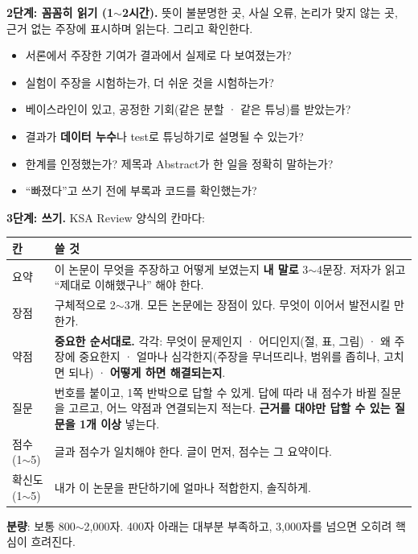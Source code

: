 \documentclass[11pt]{article}
\begin{document}
\vspace{3pt}
\noindent\textbf{2단계: 꼼꼼히 읽기 (1$\sim$2시간).} 뜻이 불분명한 곳, 사실 오류, 논리가 맞지 않는 곳, 근거 없는 주장에 표시하며 읽는다. 그리고 확인한다.
\begin{itemize}
\item 서론에서 주장한 기여가 결과에서 실제로 다 보여졌는가?
\item 실험이 주장을 시험하는가, 더 쉬운 것을 시험하는가?
\item 베이스라인이 있고, 공정한 기회(같은 분할 · 같은 튜닝)를 받았는가?
\item 결과가 \textbf{데이터 누수}나 test로 튜닝하기로 설명될 수 있는가?
\item 한계를 인정했는가? 제목과 Abstract가 한 일을 정확히 말하는가?
\item ``빠졌다''고 쓰기 전에 부록과 코드를 확인했는가?
\end{itemize}

\noindent\textbf{3단계: 쓰기.} KSA Review 양식의 칸마다:
\begin{center}
\small
\begin{tabular}{@{}p{2.6cm}p{10.6cm}@{}}
\toprule
\textbf{칸} & \textbf{쓸 것} \\
\midrule
요약 & 이 논문이 무엇을 주장하고 어떻게 보였는지 \textbf{내 말로} 3$\sim$4문장. 저자가 읽고 ``제대로 이해했구나'' 해야 한다. \\
장점 & 구체적으로 2$\sim$3개. 모든 논문에는 장점이 있다. 무엇이 이어서 발전시킬 만한가. \\
약점 & \textbf{중요한 순서대로.} 각각: 무엇이 문제인지 · 어디인지(절, 표, 그림) · 왜 주장에 중요한지 · 얼마나 심각한지(주장을 무너뜨리나, 범위를 좁히나, 고치면 되나) · \textbf{어떻게 하면 해결되는지}. \\
질문 & 번호를 붙이고, 1쪽 반박으로 답할 수 있게. 답에 따라 내 점수가 바뀔 질문을 고르고, 어느 약점과 연결되는지 적는다. \textbf{근거를 대야만 답할 수 있는 질문을 1개 이상} 넣는다. \\
점수 (1$\sim$5) & 글과 점수가 일치해야 한다. 글이 먼저, 점수는 그 요약이다. \\
확신도 (1$\sim$5) & 내가 이 논문을 판단하기에 얼마나 적합한지, 솔직하게. \\
\bottomrule
\end{tabular}
\end{center}

\noindent\textbf{분량}: 보통 800$\sim$2,000자. 400자 아래는 대부분 부족하고, 3,000자를 넘으면 오히려 핵심이 흐려진다.
\end{document}
